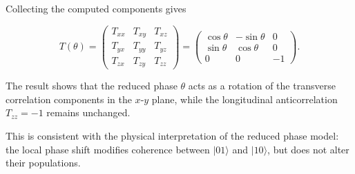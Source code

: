\medskip

Collecting the computed components gives

\begin{equation}
T(\theta)
=
\begin{pmatrix}
T_{xx} & T_{xy} & T_{xz}\\
T_{yx} & T_{yy} & T_{yz}\\
T_{zx} & T_{zy} & T_{zz}
\end{pmatrix}
=
\begin{pmatrix}
\cos\theta & -\sin\theta & 0\\
\sin\theta & \cos\theta & 0\\
0 & 0 & -1
\end{pmatrix}.
\label{eq:der_correlation_tensor_phase_model}
\end{equation}

\medskip

The result shows that the reduced phase \( \theta \) acts as a rotation of the transverse correlation components in the \( x\text{-}y \) plane, while the longitudinal anticorrelation \( T_{zz}=-1 \) remains unchanged.

This is consistent with the physical interpretation of the reduced phase model: the local phase shift modifies coherence between \( |01\rangle \) and \( |10\rangle \), but does not alter their populations.
